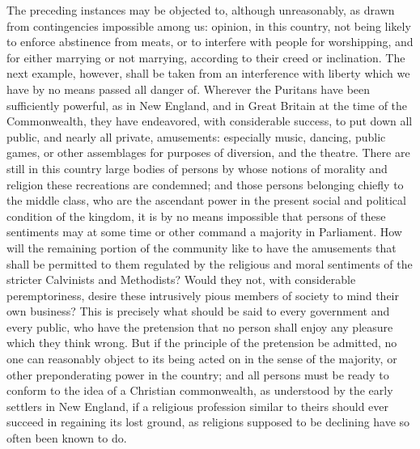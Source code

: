 \documentclass[12pt]{report}
\begin{document}
The preceding instances may be objected to, although unreasonably, as drawn from contingencies impossible among us: opinion, in this country, not being likely to enforce abstinence from meats, or to interfere with people for worshipping, and for either marrying or not marrying, according to their creed or inclination. The next example, however, shall be taken from an interference with liberty which we have by no means passed all danger of. Wherever the Puritans have been sufficiently powerful, as in New England, and in Great Britain at the time of the Commonwealth, they have endeavored, with considerable success, to put down all public, and nearly all private, amusements: especially music, dancing, public games, or other assemblages for purposes of diversion, and the theatre. There are still in this country large bodies of persons by whose notions of morality and religion these recreations are condemned; and those persons belonging chiefly to the middle class, who are the ascendant power in the present social and political condition of the kingdom, it is by no means impossible that persons of these sentiments may at some time or other command a majority in Parliament. How will the remaining portion of the community like to have the amusements that shall be permitted to them regulated by the religious and moral sentiments of the stricter Calvinists and Methodists? Would they not, with considerable peremptoriness, desire these intrusively pious members of society to mind their own business? This is precisely what should be said to every government and every public, who have the pretension that no person shall enjoy any pleasure which they think wrong. But if the principle of the pretension be admitted, no one can reasonably object to its being acted on in the sense of the majority, or other preponderating power in the country; and all persons must be ready to conform to the idea of a Christian commonwealth, as understood by the early settlers in New England, if a religious profession similar to theirs should ever succeed in regaining its lost ground, as religions supposed to be declining have so often been known to do.
\end{document}
